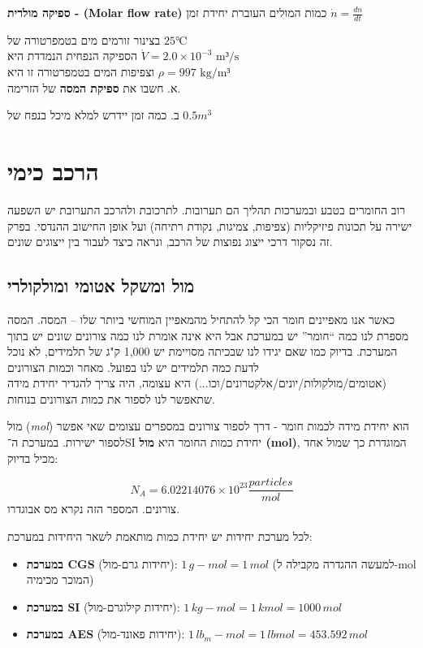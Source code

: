\documentclass[
  hebrew,
  letterpaper,
  DIV=11,
  numbers=noendperiod]{scrreprt}
\providecommand{\tightlist}{%
  \setlength{\itemsep}{0pt}\setlength{\parskip}{0pt}}
\begin{document}
\textbf{{ספיקה מולרית -} (Molar flow rate)} {כמות המולים העוברת יחידת
זמן} \(\dot{n} = \frac{dn}{dt}\)

{בצינור זורמים מים בטמפרטורה של} \(25℃\)\\
{הספיקה הנפחית הנמדדת היא}
\(\dot{V} = 2.0 \times 10^{- 3}\text{ m³/s}\)\\
{וצפיפות המים בטמפרטורה זו היא} \(\rho = 997\text{ kg/m³}\)\\
{א. חשבו את \textbf{ספיקת המסה} של הזרימה.}

{ב. כמה זמן יידרש למלא מיכל בנפח של} \(0.5m^{3}\)

\section{\texorpdfstring{{הרכב
כימי}}{הרכב כימי}}\label{ux5d4ux5e8ux5dbux5d1-ux5dbux5d9ux5deux5d9}

{רוב החומרים בטבע ובמערכות תהליך הם תערובות. לתרכובת ולהרכב התערובת יש
השפעה ישירה על תכונות פיזיקליות (צפיפות, צמיגות, נקודת רתיחה) ועל אופן
החישוב ההנדסי. בפרק זה נסקור דרכי ייצוג נפוצות של הרכב, ונראה כיצד לעבור
בין ייצוגים שונים.}

\subsection{\texorpdfstring{{מול ומשקל אטומי
ומולקולרי}}{מול ומשקל אטומי ומולקולרי}}\label{ux5deux5d5ux5dc-ux5d5ux5deux5e9ux5e7ux5dc-ux5d0ux5d8ux5d5ux5deux5d9-ux5d5ux5deux5d5ux5dcux5e7ux5d5ux5dcux5e8ux5d9}

{כאשר אנו מאפיינים חומר הכי קל להתחיל מהמאפיין המוחשי ביותר שלו -- המסה.
המסה מספרת לנו כמה ``חומר'' יש במערכת אבל היא אינה אומרת לנו כמה צורונים
שונים יש בתוך המערכת. בדיוק כמו שאם יגידו לנו שבכיתה מסויימת יש 1,000
ק"ג של תלמידים, לא נוכל לדעת כמה תלמידים יש לנו בפועל. מאחר וכמות
הצורונים (אטומים/מולקולות/יונים/אלקטרונים/וכו...) היא עצומה, היה צריך
להגדיר יחידת מידה שתאפשר לנו לספור את כמות הצורונים בנוחות.}

מול (\emph{mol}) הוא יחידת מידה לכמות חומר - דרך לספור צורונים במספרים
עצומים שאי אפשר לספור ישירות. במערכת ה־SI יחידת כמות החומר היא
\textbf{מול (mol)}, המוגדרת כך שמול אחד מכיל בדיוק:

\[N_{A} = 6.02214076 \times 10^{23}\frac{particles}{mol}\] {צורונים.
המספר הזה נקרא מס\textquotesingle{} אבוגדרו.}

לכל מערכת יחידות יש יחידת כמות מותאמת לשאר היחידות במערכת:

\begin{itemize}
\tightlist
\item
  \textbf{במערכת CGS} (יחידות גרם-מול): \(1\,g\!-\!mol = 1\,mol\) (למעשה
  ההגדרה מקבילה ל-mol המוכר מכימיה)\\
\item
  \textbf{במערכת SI} (יחידות קילוגרם-מול):
  \(1\,kg\!-\!mol = 1\,kmol = 1000\,mol\)\\
\item
  \textbf{במערכת AES} (יחידות פאונד-מול):
  \(1\,lb_{m}\!-\!mol = 1\,lbmol = 453.592\,mol\)
\end{itemize}
\end{document}
